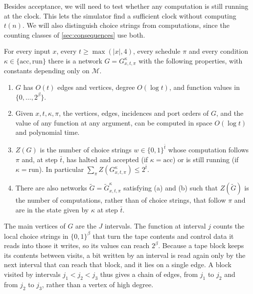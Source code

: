 \documentclass[11pt]{article}
\theoremstyle{definition}
\theoremstyle{definition}
\theoremstyle{remark}
\newcommand{\acc}{\mathrm{acc}}
\newcommand{\run}{\mathrm{run}}
\begin{document}
Besides acceptance, we will need to test whether any computation is still running at the clock. This lets the simulator find a sufficient clock without computing $t(n)$. We will also distinguish choice strings from computations, since the counting classes of \cref{sec:consequences} use both.

\begin{lemma}\label{lem:block}
For every input $x$, every $t\ge\max(|x|,4)$, every schedule $\pi$ and every condition $\kappa\in\{\acc,\run\}$ there is a network $G=G^\kappa_{x,t,\pi}$ with the following properties, with constants depending only on $\mathcal M$.
\begin{enumerate}[label=(\alph*)]
\item $G$ has $O(t)$ edges and vertices, degree $O(\log t)$, and function values in $\{0,\dots,2^\beta\}$.
\item Given $x,t,\kappa,\pi$, the vertices, edges, incidences and port orders of $G$, and the value of any function at any argument, can be computed in space $O(\log t)$ and polynomial time.
\item $Z(G)$ is the number of choice strings $w\in\{0,1\}^{\bar t}$ whose computation follows $\pi$ and, at step $\bar t$, has halted and accepted (if $\kappa=\acc$) or is still running (if $\kappa=\run$). In particular $\sum_\pi Z(G^\kappa_{x,t,\pi})\le 2^{\bar t}$.
\item There are also networks $\tilde G=\tilde G^\kappa_{x,t,\pi}$ satisfying (a) and (b) such that $Z(\tilde G)$ is the number of computations, rather than of choice strings, that follow $\pi$ and are in the state given by $\kappa$ at step $\bar t$.
\end{enumerate}
\end{lemma}

The main vertices of $G$ are the $J$ intervals. The function at interval $j$ counts the local choice strings in $\{0,1\}^\beta$ that turn the tape contents and control data it reads into those it writes, so its values can reach $2^\beta$. Because a tape block keeps its contents between visits, a bit written by an interval is read again only by the next interval that can reach that block, and it lies on a single edge. A block visited by intervals $j_1<j_2<j_3$ thus gives a chain of edges, from $j_1$ to $j_2$ and from $j_2$ to $j_3$, rather than a vertex of high degree.
\end{document}
